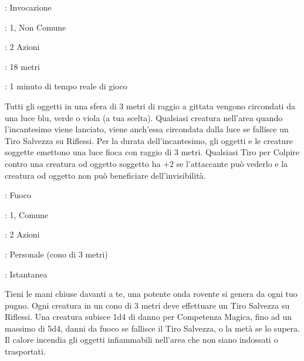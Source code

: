 \begin{multicols}{2}
\noindent\colorbox{OBSSgold!10}{
\begin{minipage}{0.95\linewidth}
\begin{description}[noitemsep, topsep=0pt, parsep=0pt, partopsep=0pt, leftmargin=0cm, labelwidth=1.3cm]
	\item[\textbf{Lista}]: Invocazione
	\item[\textbf{Livello}]: 1, Non Comune
	\item[\textbf{Lancio}]: 2 Azioni
	\item[\textbf{Gittata}]: 18 metri
	\item[\textbf{Durata}]: 1 minuto di tempo reale di gioco
\end{description}
\end{minipage}}\smallskip

Tutti gli oggetti in una sfera di 3 metri di raggio a gittata vengono circondati da una luce blu, verde o viola (a tua scelta). Qualsiasi creatura nell'area quando l'incantesimo viene lanciato, viene anch'essa circondata dalla luce se fallisce un Tiro Salvezza su Riflessi. Per la durata dell'incantesimo, gli oggetti e le creature soggette emettono una luce fioca con raggio di 3 metri. Qualsiasi Tiro per Colpire contro una creatura od oggetto soggetto ha +2 se l'attaccante può vederlo e la creatura od oggetto non può beneficiare dell'invisibilità.

\noindent\colorbox{OBSSgold!10}{
\begin{minipage}{0.95\linewidth}
\begin{description}[noitemsep, topsep=0pt, parsep=0pt, partopsep=0pt, leftmargin=0cm, labelwidth=1.3cm]
	\item[\textbf{Lista}]: Fuoco
	\item[\textbf{Livello}]: 1, Comune
	\item[\textbf{Lancio}]: 2 Azioni
	\item[\textbf{Gittata}]: Personale (cono di 3 metri)
	\item[\textbf{Durata}]: Istantanea
\end{description}
\end{minipage}}\smallskip

Tieni le mani chiuse davanti a te, una potente onda rovente si genera da ogni tuo pugno. Ogni creatura in un cono di 3 metri deve effettuare un Tiro Salvezza su Riflessi. Una creatura subisce 1d4 di danno per Competenza Magica, fino ad un massimo di 5d4, danni da fuoco se fallisce il Tiro Salvezza, o la metà se lo supera. Il calore incendia gli oggetti infiammabili nell'area che non siano indossati o trasportati.


\end{multicols}
